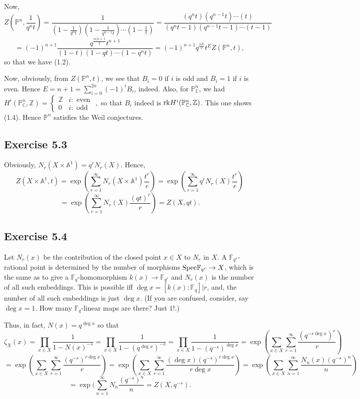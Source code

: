 \documentclass[11pt]{amsart}          %
\newcommand{\tuborg}{\left\{\begin{array}{ll}}
\newcommand{\sluttuborg}{\end{array}\right.}
\newcommand{\bbZ}{\mathbb{Z}}
\newcommand{\bbP}{\mathbb{P}}
\newcommand{\bbC}{\mathbb{C}}
\newcommand{\bbA}{\mathbb{A}}
\newcommand{\bbF}{\mathbb{F}}
\newcommand{\spec}{{\rm Spec}}
\begin{document}
Now, $$Z(\bbP^n, \frac{1}{q^n t}) = \frac{1}{(1-\frac{1}{q^nt})(1- \frac{1}{q^{n-1}t}) \cdots (1- \frac{1}{t})} = \frac{(q^nt)(q^{n-1}t) \cdots (t)}{(q^nt-1) (q^{n-1}t-1) \cdots(t-1)}$$
$$= (-1)^{n+1} \frac{q^{\frac{n(n+1}{2}} t^{n+1}}{(1-t)(1-qt) \cdots (1-q^nt)} = (-1)^{n+1} q^{\frac{nE}{2}} t^E Z(\bbP^n, t),$$ so that we have (1.2).

Now, obviously, from $Z(\bbP^n, t)$, we see that $B_i = 0$ if $i$ is odd and $B_i = 1$ if $i$ is even. Hence $E = n+1 = \sum_{i=0} ^{2n} (-1)^i B_i$, indeed. Also, for $\bbP_{\bbC} ^n$, we had $H^i (\bbP_{\bbC} ^n, \bbZ) = \tuborg \bbZ & i : \mbox{ even } \\ 0 & i: \mbox{ odd} \sluttuborg,$ so that $B_i$ indeed is ${\rm rk} H^i (\bbP_{\bbC} ^n, \bbZ)$. This one shows (1.4). Hence $\bbP^n$ satisfies the Weil conjectures.

\subsection*{Exercise 5.3} Obviously, $N_r (X \times \bbA^1) = q^r N_r (X)$. Hence,
$$Z(X \times \bbA^1 , t) = \exp (\sum_{r=1} ^{\infty} N_r(X \times \bbA^1) \frac{t^r}{r}) = \exp (\sum_{r=1} ^{\infty} q^r N_r (X) \frac{t^r}{r})$$
$$ = \exp (\sum_{r=1} ^{\infty} N_r(X) \frac{(qt)^r}{r}) = Z(X, qt).$$

\subsection*{Exercise 5.4} Let $N_r(x)$ be the contribution of the closed point $x \in X$ to $N_r$ in $X$. A $\bbF_{q^r}$-rational point is determined by the number of morphisms $\spec \bbF_{q^r} \to X$, which is the same as to give a $\bbF_{q}$-homomorphism $k(x) \to \bbF_{q^r}$ and $N_r(x)$ is the number of all such embeddings. This is possible iff $\deg x = [k(x): \bbF_q] | r$, and, the number of all such embeddings is just $\deg x$. (If you are confused, consider, say $\deg x = 1$. How many $\bbF_q$-linear maps are there? Just $1$!.)

Thus, in fact, $N(x) = q^{\deg x}$ so that
$$\zeta_X(x) = \prod_{x \in X} \frac{1}{1 - N(x)^{-s}} = \prod_{x \in X} \frac{1}{1- (q^{\deg x})^{-s}} = \prod_{x \in X} \frac{1}{1- (q^{-s})^{\deg x}} = \exp (\sum_{x \in X} \sum_{r=1} ^{\infty} \frac{(q^{-s \deg x})^r}{r}) $$
$$= \exp (\sum_{x \in X} \sum_{r=1} ^{\infty} \frac{(q^{-s})^{r \deg x}}{r}) = \exp (\sum_{x \in X} \sum_{r=1} ^{\infty} \frac{ (\deg x)(q^{-s})^{r \deg x}}{ r \deg x}) = \exp (\sum_{x \in X} \sum_{n=1} ^{\infty} \frac{N_n(x) (q^{-s})^n}{n})$$ $$ = \exp (\sum_{n=1} ^{\infty} N_n \frac{(q^{-s})^n}{n} = Z(X, q^{-s}).$$
\end{document}
